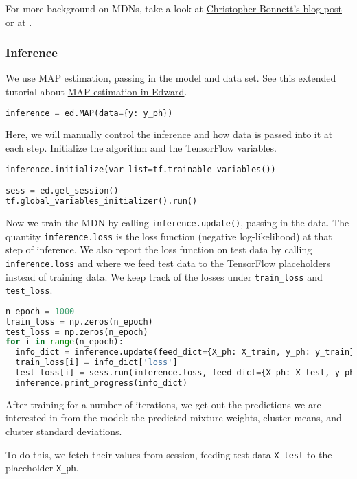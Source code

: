 For more background on MDNs, take a look at
\href{http://cbonnett.github.io/MDN.html}{Christopher Bonnett's blog
post} or at \citet{bishop1994mixture}.

\subsubsection{Inference}

We use MAP estimation, passing in the model and data set.
See this extended tutorial about
\href{/tutorials/map}{MAP estimation in Edward}.

\begin{lstlisting}[language=Python]
inference = ed.MAP(data={y: y_ph})
\end{lstlisting}

Here, we will manually control the inference and how data is passed
into it at each step.
Initialize the algorithm and the TensorFlow variables.

\begin{lstlisting}[language=Python]
inference.initialize(var_list=tf.trainable_variables())

sess = ed.get_session()
tf.global_variables_initializer().run()
\end{lstlisting}

Now we train the MDN by calling \texttt{inference.update()}, passing
in the data. The quantity \texttt{inference.loss} is the
loss function (negative log-likelihood) at that step of inference. We
also report the loss function on test data by calling
\texttt{inference.loss} and where we feed test data to the TensorFlow
placeholders instead of training data.
We keep track of the losses under \texttt{train\_loss} and \texttt{test\_loss}.

\begin{lstlisting}[language=Python]
n_epoch = 1000
train_loss = np.zeros(n_epoch)
test_loss = np.zeros(n_epoch)
for i in range(n_epoch):
  info_dict = inference.update(feed_dict={X_ph: X_train, y_ph: y_train})
  train_loss[i] = info_dict['loss']
  test_loss[i] = sess.run(inference.loss, feed_dict={X_ph: X_test, y_ph: y_test})
  inference.print_progress(info_dict)
\end{lstlisting}

After training for a number of iterations, we get out the predictions
we are interested in from the model: the predicted mixture weights,
cluster means, and cluster standard deviations.

To do this, we fetch their values from session, feeding test data
\texttt{X_test} to the placeholder \texttt{X_ph}.

